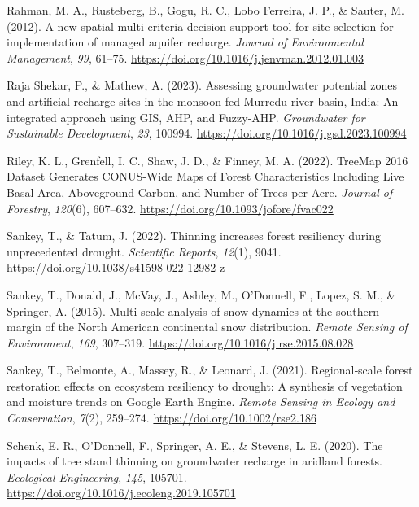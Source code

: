 \documentclass[
]{agujournal2019}
\newlength{\cslhangindent}
\newenvironment{CSLReferences}[2] %
 {\begin{list}{}{%
  \setlength{\itemindent}{0pt}
  \setlength{\leftmargin}{0pt}
  \setlength{\parsep}{0pt}
  \ifodd #1
   \setlength{\leftmargin}{\cslhangindent}
   \setlength{\itemindent}{-1\cslhangindent}
  \fi
  \setlength{\itemsep}{#2\baselineskip}}}
 {\end{list}}
\begin{document}
\begin{CSLReferences}{1}{0}
Rahman, M. A., Rusteberg, B., Gogu, R. C., Lobo Ferreira, J. P., \&
Sauter, M. (2012). A new spatial multi-criteria decision support tool
for site selection for implementation of managed aquifer recharge.
\emph{Journal of Environmental Management}, \emph{99}, 61--75.
\url{https://doi.org/10.1016/j.jenvman.2012.01.003}

Raja Shekar, P., \& Mathew, A. (2023). Assessing groundwater potential
zones and artificial recharge sites in the monsoon-fed Murredu river
basin, India: An integrated approach using GIS, AHP, and Fuzzy-AHP.
\emph{Groundwater for Sustainable Development}, \emph{23}, 100994.
\url{https://doi.org/10.1016/j.gsd.2023.100994}

Riley, K. L., Grenfell, I. C., Shaw, J. D., \& Finney, M. A. (2022).
TreeMap 2016 Dataset Generates CONUS-Wide Maps of Forest Characteristics
Including Live Basal Area, Aboveground Carbon, and Number of Trees per
Acre. \emph{Journal of Forestry}, \emph{120}(6), 607--632.
\url{https://doi.org/10.1093/jofore/fvac022}

Sankey, T., \& Tatum, J. (2022). Thinning increases forest resiliency
during unprecedented drought. \emph{Scientific Reports}, \emph{12}(1),
9041. \url{https://doi.org/10.1038/s41598-022-12982-z}

Sankey, T., Donald, J., McVay, J., Ashley, M., O'Donnell, F., Lopez, S.
M., \& Springer, A. (2015). Multi-scale analysis of snow dynamics at the
southern margin of the {North} {American} continental snow distribution.
\emph{Remote Sensing of Environment}, \emph{169}, 307--319.
\url{https://doi.org/10.1016/j.rse.2015.08.028}

Sankey, T., Belmonte, A., Massey, R., \& Leonard, J. (2021).
Regional‐scale forest restoration effects on ecosystem resiliency to
drought: A synthesis of vegetation and moisture trends on {Google}
{Earth} {Engine}. \emph{Remote Sensing in Ecology and Conservation},
\emph{7}(2), 259--274. \url{https://doi.org/10.1002/rse2.186}

Schenk, E. R., O'Donnell, F., Springer, A. E., \& Stevens, L. E. (2020).
The impacts of tree stand thinning on groundwater recharge in aridland
forests. \emph{Ecological Engineering}, \emph{145}, 105701.
\url{https://doi.org/10.1016/j.ecoleng.2019.105701}


\end{CSLReferences}
\end{document}
